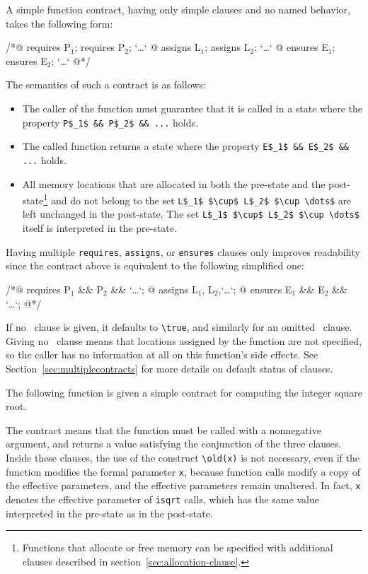 A simple function contract, having only simple clauses and no named behavior, takes the following
form:
\begin{listing}{1}
/*@ requires P$_1$; requires P$_2$; `\dots`
  @ assigns L$_1$;  assigns L$_2$;  `\dots`
  @ ensures E$_1$;  ensures E$_2$;  `\dots`
  @*/
\end{listing}
The semantics of such a contract is as follows:
\begin{itemize}
\item The caller of the function must guarantee that it is called in a
  state where the property \lstinline|P$_1$ && P$_2$ && ...| holds.
\item The called function returns a state where the property
  \lstinline|E$_1$ && E$_2$ && ...| holds.
\item All memory locations that are allocated in both the pre-state and 
  the post-state\footnote{Functions that allocate or free memory can be 
    specified with additional clauses described in
    section~\ref{sec:allocation-clause}.} 
  and do not belong to the
  set \lstinline|L$_1$ $\cup$ L$_2$ $\cup \dots$| are left unchanged in the
  post-state. The set \lstinline|L$_1$ $\cup$ L$_2$ $\cup \dots$| 
  itself is interpreted in the pre-state.
\end{itemize}

Having multiple \lstinline|requires|, \lstinline|assigns|, or 
\lstinline|ensures| clauses only improves 
readability since the contract above is equivalent to the following
simplified one:
\begin{listing}{1}
/*@ requires P$_1$ && P$_2$ && `\dots`;
  @ assigns L$_1$, L$_2$,`\dots`;
  @ ensures E$_1$ && E$_2$ && `\dots`;
  @*/
\end{listing}
If no \requires\ clause is given, it defaults to
\lstinline!\true!, and similarly for an omitted \ensures\ clause.
Giving no \assigns\ clause
means that locations assigned by the function are not specified, so
the caller has no information at all on this function's side
effects. See Section~\ref{sec:multiplecontracts} for more details on
default status of clauses.

\begin{example}
  The following function is given a simple contract for computing
  the integer square root.

%
  The contract means that the function must be called with a
  nonnegative argument, and returns a value satisfying
  the conjunction of the three \ensures{} clauses.
  Inside these \ensures{} clauses, the use of the construct \lstinline|\old(x)|
  is not necessary, even if the function modifies the formal
  parameter
  \lstinline|x|, because function calls modify a copy of the effective parameters,
  and the effective parameters remain unaltered.  In fact, \lstinline|x| denotes
  the effective parameter of \lstinline|isqrt| calls, which has the same value
  interpreted in the pre-state as in the post-state.

\end{example}

